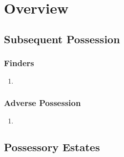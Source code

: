 \section{Overview}

\subsection{Subsequent Possession}

\subsubsection{Finders}

\begin{enumerate}
    \item %
\end{enumerate}

\subsubsection{Adverse Possession}

\begin{enumerate}
    \item %
\end{enumerate}

\subsection{Possessory Estates}

